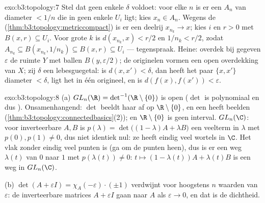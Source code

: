 \begin{solution}{exo:b3:topology:7}
Stel dat geen enkele $\delta$ voldoet: voor elke $n$ is er een
$A_n$ van diameter $< 1/n$ die in geen enkele $U_i$ ligt; kies
$x_n \in A_n$. Wegens de 
(\cref{thm:b3:topology:metriccompact}) is er een deelrij $x_{n_k}
\to x$; kies $i$ en $r > 0$ met $B(x, r) \subseteq U_i$. Voor
grote $k$ is $d(x_{n_k}, x) < r/2$ en $1/n_k < r/2$, zodat
$A_{n_k} \subseteq B(x_{n_k}, 1/n_k) \subseteq B(x, r) \subseteq
U_i$ --- tegenspraak. Heine: overdek bij gegeven $\varepsilon$ de
ruimte $Y$ met ballen $B(y, \varepsilon/2)$; de originelen vormen
een open overdekking van $X$; zij $\delta$ een lebesguegetal: is
$d(x, x') < \delta$, dan heeft het paar $\{x, x'\}$ diameter $<
\delta$, ligt het in één origineel, en is $d(f(x), f(x')) <
\varepsilon$.
\end{solution}

\begin{solution}{exo:b3:topology:8}
(a) $GL_n(\R) = \det^{-1}(\R\setminus\{0\})$ is open ($\det$ is
polynomiaal en dus ). Onsamenhangend: $\det$ beeldt haar af
op $\R\setminus\{0\}$, en een  heeft
  beelden
(\cref{thm:b3:topology:connectedbasics}(2)); en
$\R\setminus\{0\}$ is geen interval. $GL_n(\C)$: voor
inverteerbare $A, B$ is $p(\lambda) = \det\bigl((1-\lambda)A +
\lambda B\bigr)$ een veelterm in $\lambda$ met $p(0), p(1) \neq
0$, dus niet identiek nul: ze heeft eindig veel wortels in $\C$.
Het vlak zonder eindig veel punten is  (ga om de
punten heen), dus is er een weg $\lambda(t)$ van $0$ naar $1$ met
$p(\lambda(t)) \neq 0$: $t \mapsto (1-\lambda(t))A + \lambda(t)B$
is een weg in $GL_n(\C)$.

(b) $\det(A + \varepsilon I) = \chi_A(-\varepsilon)\cdot(\pm1)$
verdwijnt voor hoogstens $n$ waarden van $\varepsilon$: de
inverteerbare matrices $A + \varepsilon I$ gaan naar $A$ als
$\varepsilon \to 0$, en dat is de dichtheid.
\end{solution}

